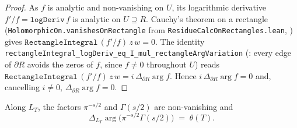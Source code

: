 \begin{proof}
\leanok
{}
As $f$ is analytic and non-vanishing on $U$, its logarithmic derivative
$f'/f=\texttt{logDeriv}\,f$ is analytic on $U\supseteq R$. Cauchy's theorem on a
rectangle (\texttt{HolomorphicOn.vanishesOnRectangle} from
\texttt{ResidueCalcOnRectangles.lean}, ) gives
$\texttt{RectangleIntegral}\,(f'/f)\,z\,w=0$. The identity
\texttt{rectangleIntegral\_logDeriv\_eq\_I\_mul\_rectangleArgVariation}
(: every edge of $\partial R$ avoids the zeros of $f$,
since $f\neq0$ throughout $U$) reads
$\texttt{RectangleIntegral}\,(f'/f)\,z\,w = i\,\Delta_{\partial R}\arg f$. Hence
$i\,\Delta_{\partial R}\arg f=0$ and, cancelling $i\neq0$,
$\Delta_{\partial R}\arg f=0$.
\end{proof}

\begin{lemma}
\label{lem:nf_arg_theta}
\leanok
{}
Along $L_T$, the factors $\pi^{-s/2}$ and $\Gamma(s/2)$ are non-vanishing and
\[
  \Delta_{L_T}\arg\bigl(\pi^{-s/2}\Gamma(s/2)\bigr) \;=\; \theta(T) .
\]
\end{lemma}

